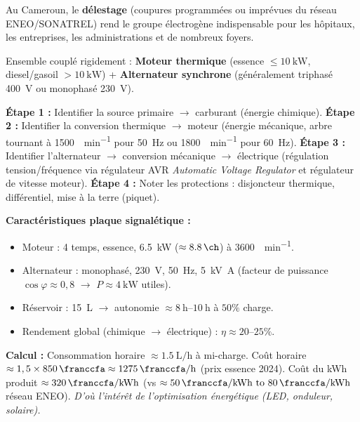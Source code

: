 \documentclass[11pt]{article}
\begin{document}
Au Cameroun, le \textbf{délestage} (coupures programmées ou imprévues du réseau ENEO/SONATREL) rend le groupe électrogène indispensable pour les hôpitaux, les entreprises, les administrations et de nombreux foyers.

\begin{definition}
Ensemble couplé rigidement : \textbf{Moteur thermique} (essence $\le \SI{10}{\kilo\watt}$, diesel/gasoil $> \SI{10}{\kilo\watt}$) + \textbf{Alternateur synchrone} (généralement triphasé \SI{400}{\volt} ou monophasé \SI{230}{\volt}).
\end{definition}

\begin{methode}
\textbf{Étape 1 :} Identifier la source primaire $\rightarrow$ carburant (énergie chimique).
\textbf{Étape 2 :} Identifier la conversion thermique $\rightarrow$ moteur (énergie mécanique, arbre tournant à \SI{1500}{\tr\per\minute} pour \SI{50}{\hertz} ou \SI{1800}{\tr\per\minute} pour \SI{60}{\hertz}).
\textbf{Étape 3 :} Identifier l'alternateur $\rightarrow$ conversion mécanique $\rightarrow$ électrique (régulation tension/fréquence via régulateur AVR \emph{Automatic Voltage Regulator} et régulateur de vitesse moteur).
\textbf{Étape 4 :} Noter les protections : disjoncteur thermique, différentiel, mise à la terre (piquet).
\end{methode}

\begin{exemplebox}
\textbf{Caractéristiques plaque signalétique :}
\begin{itemize}
    \item Moteur : 4 temps, essence, \SI{6,5}{\kilo\watt} ($\approx \SI{8,8}{\ch}$) à \SI{3600}{\tr\per\minute}.
    \item Alternateur : monophasé, \SI{230}{\volt}, \SI{50}{\hertz}, \SI{5}{\kilo\volt\ampere} (facteur de puissance $\cos\varphi \approx 0,8$ $\rightarrow$ $P \approx \SI{4}{\kilo\watt}$ utiles).
    \item Réservoir : \SI{15}{\liter} $\rightarrow$ autonomie $\approx \SIrange{8}{10}{\hour}$ à $50\%$ charge.
    \item Rendement global (chimique $\rightarrow$ électrique) : $\eta \approx 20\text{--}25\%$.
\end{itemize}
\textbf{Calcul :} Consommation horaire $\approx \SI{1,5}{\liter\per\hour}$ à mi-charge. Coût horaire $\approx 1,5 \times \SI{850}{\franccfa} \approx \SI{1275}{\franccfa\per\hour}$ (prix essence 2024). Coût du kWh produit $\approx \SI{320}{\franccfa\per\kilo\watt\hour}$ (vs $\approx \SIrange{50}{80}{\franccfa\per\kilo\watt\hour}$ réseau ENEO). \emph{D'où l'intérêt de l'optimisation énergétique (LED, onduleur, solaire).}
\end{exemplebox}
\end{document}
